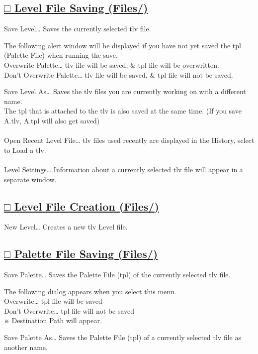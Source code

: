 \documentclass[a4paper,10pt]{article}
\begin{document}
\subsection*{\uline{□ Level File Saving (Files/)}}

\normalsize
\noindent Save Level… Saves the currently selected tlv file.\par
\footnotesize
\noindent The following alert window will be displayed if you have not yet saved the tpl (Palette File) when running the save.\\
Overwrite Palette… tlv file will be saved, \& tpl file will be overwritten.\\
Don't Overwrite Palette… tlv file will be saved, \& tpl file will not be saved.\\[-0.7em]
\par
\normalsize
\noindent Save Level As… Saves the tlv files you are currently working on with a different name.\\
\footnotesize
The tpl that is attached to the tlv is also saved at the same time. (If you save A.tlv, A.tpl will also get saved)\\[-1em]
\\
\normalsize
Open Recent Level File… tlv files used recently are displayed in the History, select to Load a tlv.\\[-0.6em]
\\
Level Settings… Information about a currently selected tlv file will appear in a separate window.\\[-0.5em]

\subsection*{\uline{□ Level File Creation (Files/)}}

\noindent New Level… Creates a new tlv Level file.\\[-0.7em]

\subsection*{\uline{□ Palette File Saving (Files/)}}

\noindent Save Palette… Saves the Palette File (tpl) of the currently selected tlv file.\par
\footnotesize
\noindent The following dialog appears when you select this menu.\\
Overwrite… tpl file will be saved\\
Don't Overwrite… tpl file will not be saved\\
※ Destination Path will appear.\\[-1.2em]
\par
\normalsize
\noindent Save Palette As… Saves the Palette File (tpl) of a currently selected tlv file as another name.
\end{document}

